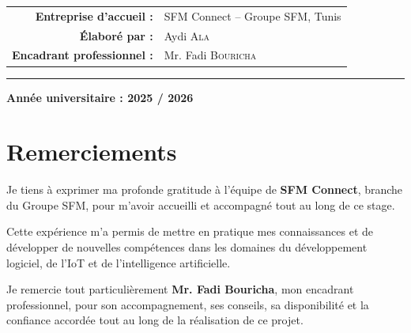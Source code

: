 \documentclass[12pt,a4paper,twoside]{report}
\begin{document}
\begin{titlepage}
\begin{center}
\begin{droppybox}
\end{droppybox}

\vspace{1.0cm}

\begin{tabular}{
    >{\bfseries}r
    @{\hspace{0.5cm}}
    l
}

\textcolor{DroppyBlue}{Entreprise d'accueil :}
&
SFM Connect -- Groupe SFM, Tunis
\\[0.35cm]

\textcolor{DroppyBlue}{Élaboré par :}
&
Aydi \textsc{Ala}
\\[0.35cm]

\textcolor{DroppyBlue}{Encadrant professionnel :}
&
Mr. Fadi \textsc{Bouricha}

\end{tabular}

\vfill

{\color{DroppyBlue}\rule{13.5cm}{0.5pt}}

\vspace{0.35cm}

{
    \large
    \bfseries
    Année universitaire : 2025 / 2026
}

\end{center}

\end{titlepage}


\chapter*{Remerciements}


Je tiens à exprimer ma profonde gratitude à l'équipe de
\textbf{SFM Connect}, branche du Groupe SFM, pour m'avoir accueilli
et accompagné tout au long de ce stage.

Cette expérience m'a permis de mettre en pratique mes connaissances
et de développer de nouvelles compétences dans les domaines du
développement logiciel, de l'IoT et de l'intelligence artificielle.

Je remercie tout particulièrement
\textbf{Mr. Fadi Bouricha}, mon encadrant professionnel, pour son
accompagnement, ses conseils, sa disponibilité et la confiance
accordée tout au long de la réalisation de ce projet.
\end{document}
